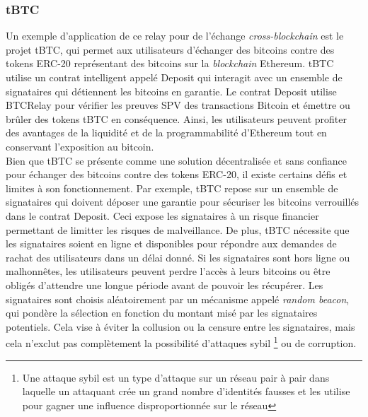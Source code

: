 \subsubsection{tBTC}
Un exemple d'application de ce relay pour de l'échange \textit{cross-blockchain} est le projet tBTC, 
qui permet aux utilisateurs d’échanger des bitcoins contre des 
tokens ERC-20 représentant des bitcoins sur la \textit{blockchain} Ethereum. \cite{hildebrandt2020tokenization,lan2021horizon} tBTC utilise un contrat intelligent 
appelé Deposit qui interagit avec un ensemble de signataires qui détiennent les bitcoins en garantie. 
Le contrat Deposit utilise BTCRelay pour vérifier les preuves SPV des transactions Bitcoin et émettre ou 
brûler des tokens tBTC en conséquence. Ainsi, les utilisateurs peuvent profiter des avantages de la liquidité 
et de la programmabilité d’Ethereum tout en conservant l’exposition au bitcoin. \\
Bien que tBTC se présente comme une solution décentralisée et sans confiance pour échanger des bitcoins contre 
des tokens ERC-20, il existe certains défis et limites à son fonctionnement. 
Par exemple, tBTC repose sur un ensemble de signataires qui doivent déposer une garantie pour sécuriser les bitcoins
verrouillés dans le contrat Deposit. Ceci expose les signataires à un risque financier permettant de limitter les risques de malveillance. 
De plus, tBTC nécessite que les signataires soient en ligne et disponibles pour répondre aux demandes de rachat des 
utilisateurs dans un délai donné. Si les signataires sont hors ligne ou malhonnêtes, les utilisateurs peuvent 
perdre l’accès à leurs bitcoins ou être obligés d’attendre une longue période avant de pouvoir les récupérer. 
Les signataires sont choisis aléatoirement par un mécanisme appelé \textit{random beacon}, qui pondère la sélection en 
fonction du montant misé par les signataires potentiels. Cela vise à éviter la collusion ou la censure entre les 
signataires, mais cela n’exclut pas complètement la possibilité d’attaques sybil \footnote{Une attaque sybil est 
un type d’attaque sur un réseau pair à pair dans laquelle un attaquant crée un grand nombre d’identités fausses 
et les utilise pour gagner une influence disproportionnée sur le réseau} ou de corruption.